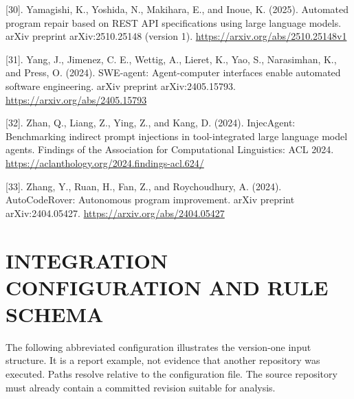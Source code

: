 \documentclass[12pt,a4paper,oneside]{report}
\begin{document}
\begingroup\setlength{\hangindent}{0pt} [30]. Yamagishi, K., Yoshida, N., Makihara, E., and Inoue, K. (2025). Automated program repair based on REST API specifications using large language models. arXiv preprint arXiv:2510.25148 (version 1). \url{https://arxiv.org/abs/2510.25148v1}\par\endgroup\vspace{6pt}
\begingroup\setlength{\hangindent}{0pt} [31]. Yang, J., Jimenez, C. E., Wettig, A., Lieret, K., Yao, S., Narasimhan, K., and Press, O. (2024). SWE-agent: Agent-computer interfaces enable automated software engineering. arXiv preprint arXiv:2405.15793. \url{https://arxiv.org/abs/2405.15793}\par\endgroup\vspace{6pt}
\begingroup\setlength{\hangindent}{0pt} [32]. Zhan, Q., Liang, Z., Ying, Z., and Kang, D. (2024). InjecAgent: Benchmarking indirect prompt injections in tool-integrated large language model agents. Findings of the Association for Computational Linguistics: ACL 2024. \url{https://aclanthology.org/2024.findings-acl.624/}\par\endgroup\vspace{6pt}
\begingroup\setlength{\hangindent}{0pt} [33]. Zhang, Y., Ruan, H., Fan, Z., and Roychoudhury, A. (2024). AutoCodeRover: Autonomous program improvement. arXiv preprint arXiv:2404.05427. \url{https://arxiv.org/abs/2404.05427}\par\endgroup\vspace{6pt}

\clearpage{}
{}
\let\reportaddcontentsline\addcontentsline
\renewcommand{\addcontentsline}[3]{%
  \def\reporttoclevel{#2}\def\reportchapterlevel{chapter}%
  \ifx\reporttoclevel\reportchapterlevel
    \reportaddcontentsline{#1}{appendixentry}{#3}%
  \else
    \reportaddcontentsline{#1}{#2}{#3}%
  \fi}
\renewcommand{\theHchapter}{appendix.\arabic{chapter}}
\renewcommand{\chaptername}{APPENDIX}
\renewcommand{\thetable}{A\thechapter.\arabic{table}}
\setcounter{chapter}{0}
\chapter{INTEGRATION CONFIGURATION AND RULE SCHEMA}

The following abbreviated configuration illustrates the version-one input structure. It is a report example, not evidence that another repository was executed. Paths resolve relative to the configuration file. The source repository must already contain a committed revision suitable for analysis.
\end{document}
